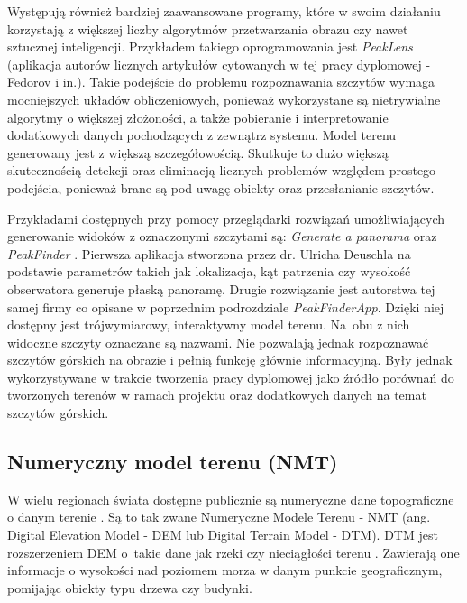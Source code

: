 \par

Występują również bardziej zaawansowane programy, które w swoim działaniu korzystają z większej liczby algorytmów przetwarzania obrazu czy nawet sztucznej inteligencji. Przykładem takiego oprogramowania jest \textit{PeakLens} \cite{PeakLens} (aplikacja autorów licznych artykułów cytowanych w tej pracy dyplomowej - Fedorov i in.). Takie podejście do problemu rozpoznawania szczytów wymaga mocniejszych układów obliczeniowych, ponieważ wykorzystane są nietrywialne algorytmy o większej złożoności, a także pobieranie i interpretowanie dodatkowych danych pochodzących z zewnątrz systemu. Model terenu generowany jest z większą szczegółowością. Skutkuje to dużo większą skutecznością detekcji oraz eliminacją licznych problemów względem prostego podejścia, ponieważ brane są pod uwagę obiekty oraz przesłanianie szczytów.

\par

Przykładami dostępnych przy pomocy przeglądarki rozwiązań umożliwiających generowanie widoków z oznaczonymi szczytami są: \textit{Generate a panorama} \cite{generate_panorama} oraz \textit{PeakFinder} \cite{peakfinder}. Pierwsza aplikacja stworzona przez dr. Ulricha Deuschla na podstawie parametrów takich jak lokalizacja, kąt patrzenia czy wysokość obserwatora generuje płaską panoramę. Drugie rozwiązanie jest autorstwa tej samej firmy co opisane w poprzednim podrozdziale \textit{PeakFinderApp}. Dzięki niej dostępny jest trójwymiarowy, interaktywny model terenu. Na~obu z nich widoczne szczyty oznaczane są nazwami. Nie pozwalają jednak rozpoznawać szczytów górskich na obrazie i pełnią funkcję głównie informacyjną. Były jednak wykorzystywane w trakcie tworzenia pracy dyplomowej jako źródło porównań do tworzonych terenów w ramach projektu oraz dodatkowych danych na temat szczytów górskich. 


\subsection{Numeryczny model terenu (NMT)} \label{section:nmt}

W wielu regionach świata dostępne publicznie są numeryczne dane topograficzne o danym terenie \cite{NMT-geoportal}. Są to tak zwane Numeryczne Modele Terenu - NMT (ang. Digital Elevation Model - DEM lub Digital Terrain Model - DTM). DTM jest rozszerzeniem DEM o~takie dane jak rzeki czy nieciągłości terenu \cite{DEM_DSM_DTM} . Zawierają one informacje o wysokości nad poziomem morza w danym punkcie geograficznym, pomijając obiekty typu drzewa czy budynki. 


